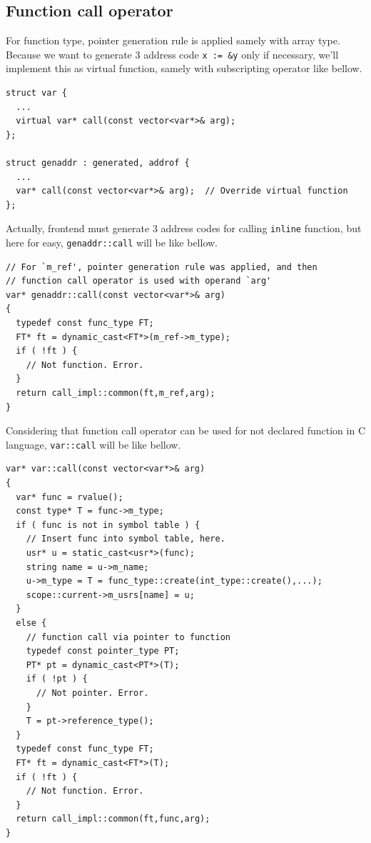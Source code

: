 \subsection{Function call operator}
\label{expr_e006}

For function type, pointer generation rule is applied
samely with array type. Because we want to generate 3 address code
{\tt{x := \&y}} only if necessary,
we'll implement this as virtual function, samely with subscripting
operator like bellow.
\begin{verbatim}
struct var {
  ...
  virtual var* call(const vector<var*>& arg);
};

struct genaddr : generated, addrof {
  ...
  var* call(const vector<var*>& arg);  // Override virtual function
};
\end{verbatim}
Actually, frontend must generate 3 address codes
for calling {\tt{inline}} function, but here for easy,
{\tt{genaddr::call}} will be like bellow.  
\begin{verbatim}
// For `m_ref', pointer generation rule was applied, and then
// function call operator is used with operand `arg'
var* genaddr::call(const vector<var*>& arg)
{
  typedef const func_type FT;
  FT* ft = dynamic_cast<FT*>(m_ref->m_type);
  if ( !ft ) {
    // Not function. Error.
  }
  return call_impl::common(ft,m_ref,arg);
}
\end{verbatim}
Considering that function call operator can be used for not
declared function in C language, 
{\tt{var::call}} will be like bellow.
\begin{verbatim}
var* var::call(const vector<var*>& arg)
{
  var* func = rvalue();
  const type* T = func->m_type;
  if ( func is not in symbol table ) {
    // Insert func into symbol table, here.
    usr* u = static_cast<usr*>(func);
    string name = u->m_name;
    u->m_type = T = func_type::create(int_type::create(),...);
    scope::current->m_usrs[name] = u;
  }
  else {
    // function call via pointer to function
    typedef const pointer_type PT;
    PT* pt = dynamic_cast<PT*>(T);
    if ( !pt ) {
      // Not pointer. Error.
    }
    T = pt->reference_type();
  }
  typedef const func_type FT;
  FT* ft = dynamic_cast<FT*>(T);
  if ( !ft ) {
    // Not function. Error.
  }
  return call_impl::common(ft,func,arg);
}
\end{verbatim}

